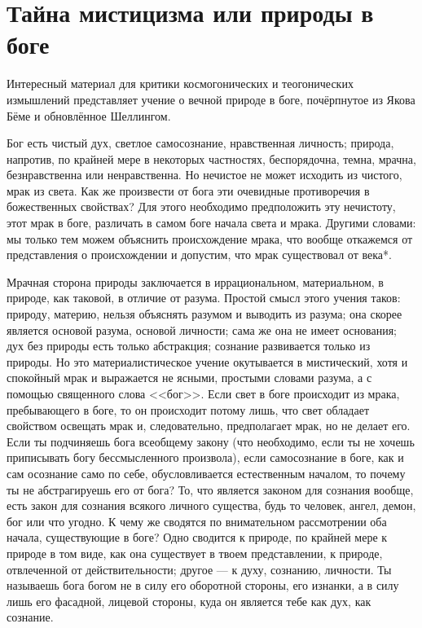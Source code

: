 \documentclass[12pt,oneside]{book}
\begin{document}
\chapter{Тайна мистицизма или природы в боге}


Интересный материал для критики космогонических и теогонических измышлений представляет учение о вечной природе в боге, почёрпнутое из Якова Бёме и обновлённое Шеллингом.

Бог есть чистый дух, светлое самосознание, нравственная личность; природа, напротив, по крайней мере в некоторых частностях, беспорядочна, темна, мрачна, безнравственна или ненравственна. Но нечистое не может исходить из чистого, мрак из света. Как же произвести от бога эти очевидные противоречия в божественных свойствах? Для этого необходимо предположить эту нечистоту, этот мрак в боге, различать в самом боге начала света и мрака. Другими словами: мы только тем можем объяснить происхождение мрака, что вообще откажемся от представления о происхождении и допустим, что мрак существовал от века*\let\svthefootnote\thefootnote\let\thefootnote\relax{}\let\thefootnote\svthefootnote.



Мрачная сторона природы заключается в иррациональном, материальном, в природе, как таковой, в отличие от разума. Простой смысл этого учения таков: природу, материю, нельзя объяснять разумом и выводить из разума; она скорее является основой разума, основой личности; сама же она не имеет основания; дух без природы есть только абстракция; сознание развивается только из природы. Но это материалистическое учение окутывается в мистический, хотя и спокойный мрак и выражается не ясными, простыми словами разума, а с помощью священного слова <<бог>>. Если свет в боге происходит из мрака, пребывающего в боге, то он происходит потому лишь, что свет обладает свойством освещать мрак и, следовательно, предполагает мрак, но не делает его. Если ты подчиняешь бога всеобщему закону (что необходимо, если ты не хочешь приписывать богу бессмысленного произвола), если самосознание в боге, как и сам осознание само по себе, обусловливается естественным началом, то почему ты не абстрагируешь его от бога? То, что является законом для сознания вообще, есть закон для сознания всякого личного существа, будь то человек, ангел, демон, бог или что угодно. К чему же сводятся по внимательном рассмотрении оба начала, существующие в боге? Одно сводится к природе, по крайней мере к природе в том виде, как она существует в твоем представлении, к природе, отвлеченной от действительности; другое --- к духу, сознанию, личности. Ты называешь бога богом не в силу его оборотной стороны, его изнанки, а в силу лишь его фасадной, лицевой стороны, куда он является тебе как дух, как сознание.
\end{document}
